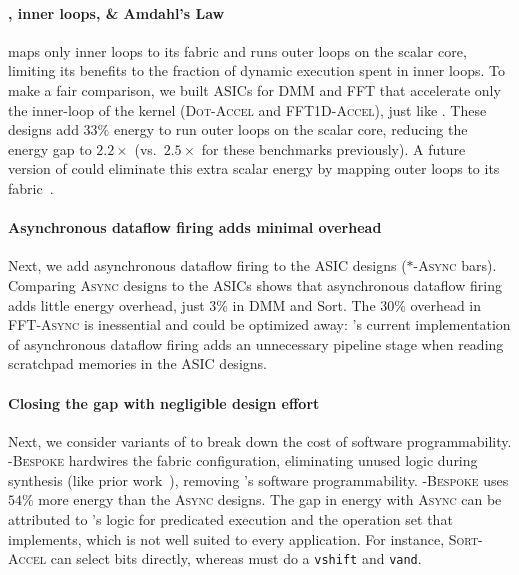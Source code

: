 \paragraph{\snafuarch, inner loops, \& Amdahl's Law}
\snafu maps only inner loops to its fabric and runs outer loops on the
scalar core, limiting its benefits to the fraction of dynamic
execution spent in inner loops.
%
To make a fair comparison, we built ASICs for DMM and FFT that
accelerate only the inner-loop of the kernel ({\scshape Dot-Accel} and
{\scshape FFT1D-Accel}), just like \snafuarch.
% 
These designs add $33\%$ energy to run outer loops on the scalar core,
reducing the energy gap to $2.2\times$ (vs.\ $2.5\times$ for these benchmarks previously).
%
A future version of \snafu could eliminate this extra scalar energy by mapping outer loops to its fabric~\cite{weng2020hybrid}.

\paragraph{Asynchronous dataflow firing adds minimal overhead}
Next, we add asynchronous dataflow firing to the ASIC designs
({\scshape $*$-Async} bars).
% 
Comparing {\scshape Async} designs to the ASICs shows that asynchronous dataflow
firing adds little energy overhead, just 3\% in DMM and Sort.
%
The 30\% overhead in {\scshape FFT-Async} is inessential and could be optimized away:
\snafu's current implementation of asynchronous dataflow firing adds an unnecessary pipeline stage when reading scratchpad memories in the ASIC designs.

\paragraph{Closing the gap with negligible design effort}
Next, we consider variants of \snafuarch to break down the cost of
software programmability.
%
{\scshape \snafu-Bespoke} hardwires the fabric configuration, eliminating unused
logic during synthesis (like prior work~\cite{cherupalli:isca17:bespoke}),
removing \snafuarch's software programmability.
%
{\scshape \snafu-Bespoke} uses $54\%$ more energy than the {\scshape Async} designs.
% 
The gap in energy with {\scshape Async} can be attributed to \snafu's logic for
predicated execution and the operation set that \snafu implements, which is not
well suited to every application.  For instance, {\scshape Sort-Accel} can
select bits directly, whereas \snafu must do a {\tt vshift} and {\tt vand}.

